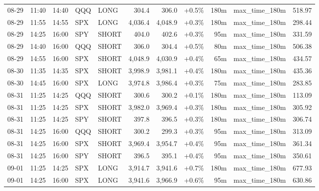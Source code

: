 \documentclass[11pt,a4paper,twoside]{article}
\begin{document}
\begin{center}
\begin{longtable}{>{\color{txtmain}}l l l l l r r r r >{\color{txtmain}}l r}
08-29 & 11:40 & 14:40 & QQQ & LONG & 304.4 & 306.0 & \textcolor{wingreen}{+0.5\%} & 180m & max\_time\_180m & \textcolor{wingreen}{518.97} \\
08-29 & 11:55 & 14:55 & SPX & LONG & 4,036.4 & 4,048.9 & \textcolor{wingreen}{+0.3\%} & 180m & max\_time\_180m & \textcolor{wingreen}{298.44} \\
08-29 & 14:25 & 16:00 & SPY & SHORT & 404.0 & 402.6 & \textcolor{wingreen}{+0.3\%} & 95m & max\_time\_180m & \textcolor{wingreen}{331.59} \\
08-29 & 14:40 & 16:00 & QQQ & SHORT & 306.0 & 304.4 & \textcolor{wingreen}{+0.5\%} & 80m & max\_time\_180m & \textcolor{wingreen}{506.38} \\
08-29 & 14:55 & 16:00 & SPX & SHORT & 4,048.9 & 4,030.9 & \textcolor{wingreen}{+0.4\%} & 65m & max\_time\_180m & \textcolor{wingreen}{434.57} \\
08-30 & 11:35 & 14:35 & SPX & SHORT & 3,998.9 & 3,981.1 & \textcolor{wingreen}{+0.4\%} & 180m & max\_time\_180m & \textcolor{wingreen}{435.36} \\
08-30 & 14:45 & 16:00 & SPX & LONG & 3,974.8 & 3,986.4 & \textcolor{wingreen}{+0.3\%} & 75m & max\_time\_180m & \textcolor{wingreen}{283.85} \\
08-31 & 11:25 & 14:25 & QQQ & SHORT & 300.6 & 300.2 & \textcolor{wingreen}{+0.1\%} & 180m & max\_time\_180m & \textcolor{wingreen}{113.09} \\
08-31 & 11:25 & 14:25 & SPX & SHORT & 3,982.0 & 3,969.4 & \textcolor{wingreen}{+0.3\%} & 180m & max\_time\_180m & \textcolor{wingreen}{305.92} \\
08-31 & 11:25 & 14:25 & SPY & SHORT & 397.8 & 396.5 & \textcolor{wingreen}{+0.3\%} & 180m & max\_time\_180m & \textcolor{wingreen}{306.74} \\
08-31 & 14:25 & 16:00 & QQQ & SHORT & 300.2 & 299.3 & \textcolor{wingreen}{+0.3\%} & 95m & max\_time\_180m & \textcolor{wingreen}{313.09} \\
08-31 & 14:25 & 16:00 & SPX & SHORT & 3,969.4 & 3,954.7 & \textcolor{wingreen}{+0.4\%} & 95m & max\_time\_180m & \textcolor{wingreen}{361.34} \\
08-31 & 14:25 & 16:00 & SPY & SHORT & 396.5 & 395.1 & \textcolor{wingreen}{+0.4\%} & 95m & max\_time\_180m & \textcolor{wingreen}{350.61} \\
09-01 & 11:25 & 14:25 & SPX & LONG & 3,914.7 & 3,941.6 & \textcolor{wingreen}{+0.7\%} & 180m & max\_time\_180m & \textcolor{wingreen}{677.93} \\
09-01 & 14:25 & 16:00 & SPX & LONG & 3,941.6 & 3,966.9 & \textcolor{wingreen}{+0.6\%} & 95m & max\_time\_180m & \textcolor{wingreen}{630.86} \\

\end{longtable}
\end{center}
\end{document}
